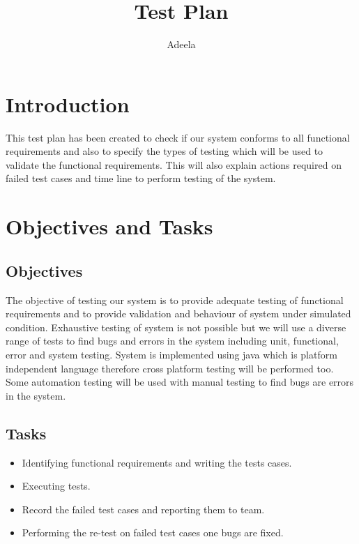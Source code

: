 \documentclass[11pt, oneside]{article}   	%
\title{Test Plan}
\author{Adeela}
\begin{document}
\maketitle
\section{Introduction}
This test plan has been created to check if our system conforms to all functional requirements and also to specify the types of testing which will be used to validate the functional requirements. This will also explain actions required on failed test cases and time line to perform testing of the system.
\section{Objectives and Tasks}
\subsection{Objectives}
The objective of testing our system is to provide adequate testing of functional requirements and to provide validation and behaviour of system under simulated condition. Exhaustive testing of system is not possible but we will use a diverse range of tests to find bugs and errors in the system including unit, functional, error and system testing. System is implemented using java which is platform independent language therefore cross platform testing will be performed too. Some automation testing will be used with manual testing to find bugs are errors in the system.
\subsection{Tasks}
\begin{itemize}
\item Identifying functional requirements and writing the tests cases.
\item Executing tests.
\item Record the failed test cases and reporting them to team.
\item Performing the re-test on failed test cases one bugs are fixed.
\end{itemize}
\end{document}

